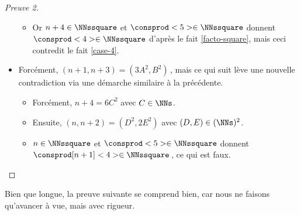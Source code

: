 \begin{proof}[Preuve 2]
\begin{itemize}
\begin{itemize}
			\item Or $n + 4 \in \NNssquare$ et $\consprod<5> \in \NNssquare$ donnent $\consprod<4> \in \NNssquare$ d'après le fait \ref{facto-square}, mais ceci contredit le fait \ref{case-4}.
		\end{itemize}
	
		\item Forcément, $(n + 1, n + 3) = (3 A^2, B^2)$\,, mais ce qui suit lève une nouvelle contradiction via une démarche similaire à la précédente.
		\begin{itemize}
			\item Forcément, $n + 4 = 6 C^2$ avec $C \in \NNs$. 

			\item Ensuite, $(n, n + 2) = (D^2, 2 E^2)$ avec $(D, E) \in ( \NNs )^2$.

			\item $n \in \NNssquare$ et $\consprod<5> \in \NNssquare$ donnent $\consprod[n+1]<4> \in \NNssquare$\,, ce qui est faux.
		\end{itemize}
    \end{itemize}
\end{proof}




Bien que longue, la preuve suivante se comprend bien, car nous ne faisons qu'avancer à vue, mais avec rigueur.


